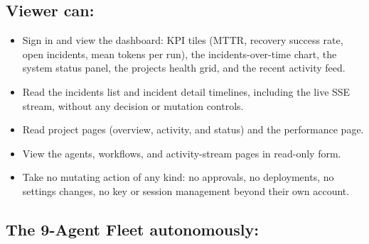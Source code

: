 \subsection{Viewer can:}

\begin{itemize}[nosep]
  \item Sign in and view the dashboard: KPI tiles (MTTR, recovery success
        rate, open incidents, mean tokens per run), the incidents-over-time
        chart, the system status panel, the projects health grid, and the
        recent activity feed.
  \item Read the incidents list and incident detail timelines, including the
        live SSE stream, without any decision or mutation controls.
  \item Read project pages (overview, activity, and status) and the
        performance page.
  \item View the agents, workflows, and activity-stream pages in read-only
        form.
  \item Take no mutating action of any kind: no approvals, no deployments, no
        settings changes, no key or session management beyond their own
        account.
\end{itemize}

\subsection{The 9-Agent Fleet autonomously:}

